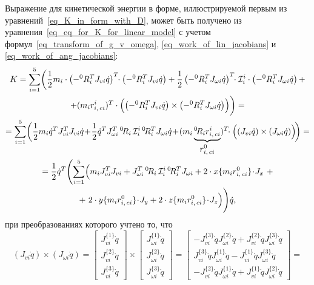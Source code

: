Выражение для кинетической энергии в форме, иллюстрируемой первым из уравнений~\eqref{eq_K_in_form_with_D}, может быть получено из уравнения~\eqref{eq_eq_for_K_for_linear_model} с учетом формул~\eqref{eq_transform_of_g_v_omega}, \eqref{eq_work_of_lin_jacobians} и \eqref{eq_work_of_ang_jacobians}:
\begin{gather}
    K = \sum_{i=1}^5 \biggl( \frac{1}{2} m_i \cdot \left( -{}^0R_i^T J_{vi} \dot{q} \right)^T \!\!\cdot \left(-{}^0R_i^T J_{vi} \dot{q}\right) + \frac{1}{2} \left( -{}^0R_i^T J_{\omega i} \dot{q} \right)^T \!\!\cdot \mathcal{I}^{i}_i \cdot \left( -{}^0R_i^T J_{\omega i} \dot{q} \right) + \notag\\
    + (m_ir^i_{i,\,ci})^T \cdot \Bigl( \left( -{}^0R_i^T J_{vi} \dot{q} \right) \times \left( -{}^0R_i^T J_{\omega i} \dot{q} \right) \Bigr) \biggr) = \notag\\
    = \sum_{i=1}^5 \biggl(\frac{1}{2} m_i \dot{q}^T J_{vi}^T J_{vi} \dot{q} \!+\! \frac{1}{2} \dot{q}^T J_{\omega i}^T \, {}^0\!R_i \, \mathcal{I}^{i}_i \, {}^0\!R_i^T J_{\omega i} \dot{q} \!+\! (m_i \underbrace{{}^0\!R_i r^i_{i,\,ci}}_{\displaystyle r^0_{i,\,ci}})^T \!\!\cdot \Bigl( \left( J_{vi} \dot{q} \right) \times \left( J_{\omega i} \dot{q} \right) \Bigr) \!\biggr) = \notag \\
    = \frac{1}{2} \dot{q}^T \Biggl(\sum_{i=1}^5 \Bigl(m_i J_{vi}^T J_{vi} + J_{\omega i}^T \, {}^0\!R_i \, \mathcal{I}^{i}_i \, {}^0\!R_i^T J_{\omega i} + 2 \cdot x\{ m_i r^0_{i,\,ci} \} \!\cdot\! J_{x} \,\, + \notag \\
    + \,\, 2 \cdot y\{ m_i r^0_{i,\,ci} \} \!\cdot\! J_{y} + 2 \cdot z\{ m_i r^0_{i,\,ci} \} \!\cdot\! J_{z}\Bigr) \Biggr) \dot{q}, \label{eq_getting_form_with_D_for_K}
\end{gather}
при преобразованиях которого учтено то, что
\begin{equation*}
    \left( J_{vi} \dot{q} \right) \times \left( J_{\omega i} \dot{q} \right) =
    \begin{bmatrix}
        J_{vi}^{\{1\}} \dot{q}\\
        J_{vi}^{\{2\}} \dot{q}\\
        J_{vi}^{\{3\}} \dot{q}
    \end{bmatrix}
    \times
    \begin{bmatrix}
        J_{\omega i}^{\{1\}} \dot{q}\\
        J_{\omega i}^{\{2\}} \dot{q}\\
        J_{\omega i}^{\{3\}} \dot{q}
    \end{bmatrix}
    =
    \begin{bmatrix}
        -J_{vi}^{\{3\}} \dot{q} J_{\omega i}^{\{2\}} \dot{q} + J_{vi}^{\{2\}} \dot{q} J_{\omega i}^{\{3\}} \dot{q}\\
         J_{vi}^{\{3\}} \dot{q} J_{\omega i}^{\{1\}} \dot{q} - J_{vi}^{\{1\}} \dot{q} J_{\omega i}^{\{3\}} \dot{q}\\
        -J_{vi}^{\{2\}} \dot{q} J_{\omega i}^{\{1\}} \dot{q} + J_{vi}^{\{1\}} \dot{q} J_{\omega i}^{\{2\}} \dot{q}
    \end{bmatrix}
    =
\end{equation*}
